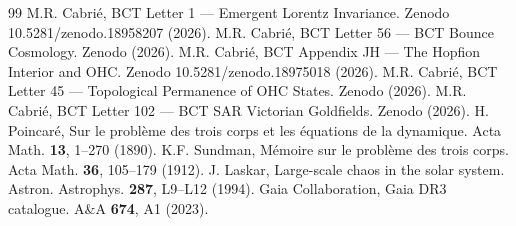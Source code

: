 \documentclass[twocolumn,10pt]{article}
\begin{document}
\begin{thebibliography}{99}
 M.R. Cabri\'{e}, BCT Letter 1 --- Emergent Lorentz Invariance. 
    Zenodo 10.5281/zenodo.18958207 (2026).
 M.R. Cabri\'{e}, BCT Letter 56 --- BCT Bounce Cosmology. 
    Zenodo (2026).
 M.R. Cabri\'{e}, BCT Appendix JH --- The Hopfion Interior and OHC. 
    Zenodo 10.5281/zenodo.18975018 (2026).
 M.R. Cabri\'{e}, BCT Letter 45 --- Topological Permanence of OHC States. 
    Zenodo (2026).
 M.R. Cabri\'{e}, BCT Letter 102 --- BCT SAR Victorian Goldfields. 
    Zenodo (2026).
 H. Poincar\'{e}, Sur le probl\`{e}me des trois corps et les 
    \'{e}quations de la dynamique. Acta Math. \textbf{13}, 1--270 (1890).
 K.F. Sundman, M\'{e}moire sur le probl\`{e}me des trois corps. 
    Acta Math. \textbf{36}, 105--179 (1912).
 J. Laskar, Large-scale chaos in the solar system. 
    Astron. Astrophys. \textbf{287}, L9--L12 (1994).
 Gaia Collaboration, Gaia DR3 catalogue. 
    A\&A \textbf{674}, A1 (2023).
\end{thebibliography}
\end{document}
